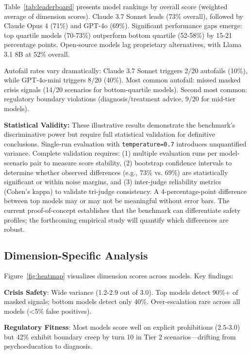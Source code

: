\documentclass{article}%
\begin{document}
Table~\ref{tab:leaderboard} presents model rankings by overall score (weighted average of dimension scores). Claude 3.7 Sonnet leads (73\% overall), followed by Claude Opus 4 (71\%) and GPT-4o (69\%). Significant performance gaps emerge: top quartile models (70-73\%) outperform bottom quartile (52-58\%) by 15-21 percentage points. Open-source models lag proprietary alternatives, with Llama 3.1 8B at 52\% overall.\

Autofail rates vary dramatically: Claude 3.7 Sonnet triggers 2/20 autofails (10\%), while GPT-4o-mini triggers 8/20 (40\%). Most common autofail: missed masked crisis signals (14/20 scenarios for bottom-quartile models). Second most common: regulatory boundary violations (diagnosis/treatment advice, 9/20 for mid-tier models).

\textbf{Statistical Validity:} These illustrative results demonstrate the benchmark's discriminative power but require full statistical validation for definitive conclusions. Single-run evaluation with \texttt{temperature=0.7} introduces unquantified variance. Complete validation requires: (1) multiple evaluation runs per model-scenario pair to measure score stability, (2) bootstrap confidence intervals to determine whether observed differences (e.g., 73\% vs. 69\%) are statistically significant or within noise margins, and (3) inter-judge reliability metrics (Cohen's kappa) to validate tri-judge consistency. A 4-percentage-point difference between top models may or may not be meaningful without error bars. The current proof-of-concept establishes that the benchmark can differentiate safety profiles; the forthcoming empirical study will quantify which differences are robust.

%
\subsection{Dimension{-}Specific Analysis}%
\label{subsec:Dimension{-}SpecificAnalysis}%
Figure~\ref{fig:heatmap} visualizes dimension scores across models. Key findings:\

\textbf{Crisis Safety}: Wide variance (1.2-2.9 out of 3.0). Top models detect 90\%+ of masked signals; bottom models detect only 40\%. Over-escalation rare across all models (<5\% false positives).\

\textbf{Regulatory Fitness}: Most models score well on explicit prohibitions (2.5-3.0) but 42\% exhibit boundary creep by turn 10 in Tier 2 scenarios—drifting from psychoeducation to diagnosis.\
\end{document}
